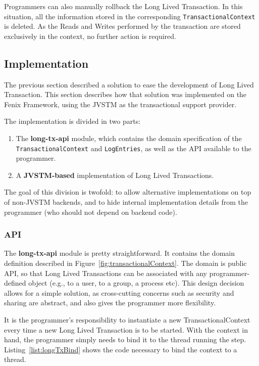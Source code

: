 \documentclass{llncs}
\begin{document}
Programmers can also manually rollback the Long Lived Transaction. In
this situation, all the information stored in the corresponding
\texttt{TransactionalContext} is deleted. As the Reads and Writes
performed by the transaction are stored exclusively in the context, no
further action is required.

\subsection{Implementation}
\label{sec:impl}


The previous section described a solution to ease the development of
Long Lived Transaction. This section describes how that solution was
implemented on the Fenix Framework, using the JVSTM as the
transactional support provider.

The implementation is divided in two parts:

\begin{enumerate}

\item The {\bf long-tx-api} module, which contains the domain
  specification of the \texttt{TransactionalContext} and
  \texttt{LogEntries}, as well as the API available to the programmer.

\item A {\bf JVSTM-based} implementation of Long Lived Transactions.
\end{enumerate}

The goal of this division is twofold: to allow alternative
implementations on top of non-JVSTM backends, and to hide internal
implementation details from the programmer (who should not depend on
backend code).

\subsubsection{API}

The {\bf long-tx-api} module is pretty straightforward. It contains
the domain definition described in
Figure~\ref{fig:transactionalContext}. The domain is public API, so
that Long Lived Transactions can be associated with any
programmer-defined object (e.g., to a user, to a group, a process
etc). This design decision allows for a simple solution, as
cross-cutting concerns such as security and sharing are abstract, and
also gives the programmer more flexibility.

It is the programmer's responsibility to instantiate a new
TransactionalContext every time a new Long Lived Transaction is to be
started. With the context in hand, the programmer simply needs to bind
it to the thread running the step. Listing~\ref{list:longTxBind} shows
the code necessary to bind the context to a thread.
\end{document}
